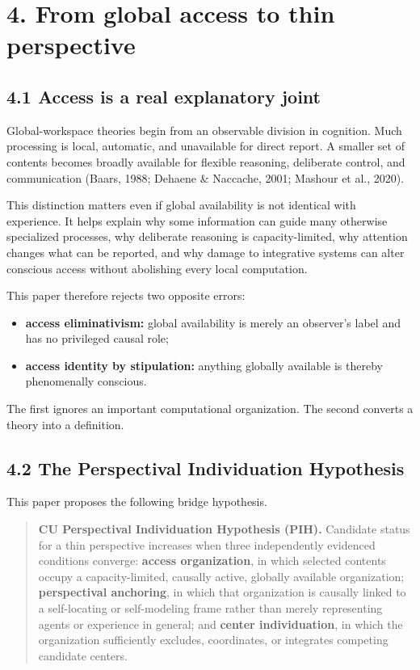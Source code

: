 \documentclass[
  11pt,
]{article}
\providecommand{\tightlist}{%
  \setlength{\itemsep}{0pt}\setlength{\parskip}{0pt}}
\begin{document}
\section{4. From global access to thin
perspective}\label{from-global-access-to-thin-perspective}

\subsection{4.1 Access is a real explanatory
joint}\label{access-is-a-real-explanatory-joint}

Global-workspace theories begin from an observable division in
cognition. Much processing is local, automatic, and unavailable for
direct report. A smaller set of contents becomes broadly available for
flexible reasoning, deliberate control, and communication (Baars, 1988;
Dehaene \& Naccache, 2001; Mashour et al., 2020).

This distinction matters even if global availability is not identical
with experience. It helps explain why some information can guide many
otherwise specialized processes, why deliberate reasoning is
capacity-limited, why attention changes what can be reported, and why
damage to integrative systems can alter conscious access without
abolishing every local computation.

This paper therefore rejects two opposite errors:

\begin{itemize}
\tightlist
\item
  \textbf{access eliminativism:} global availability is merely an
  observer's label and has no privileged causal role;
\item
  \textbf{access identity by stipulation:} anything globally available
  is thereby phenomenally conscious.
\end{itemize}

The first ignores an important computational organization. The second
converts a theory into a definition.

\subsection{4.2 The Perspectival Individuation
Hypothesis}\label{the-perspectival-individuation-hypothesis}

This paper proposes the following bridge hypothesis.

\begin{quote}
\textbf{CU Perspectival Individuation Hypothesis (PIH).} Candidate
status for a thin perspective increases when three independently
evidenced conditions converge: \textbf{access organization}, in which
selected contents occupy a capacity-limited, causally active, globally
available organization; \textbf{perspectival anchoring}, in which that
organization is causally linked to a self-locating or self-modeling
frame rather than merely representing agents or experience in general;
and \textbf{center individuation}, in which the organization
sufficiently excludes, coordinates, or integrates competing candidate
centers.
\end{quote}
\end{document}
